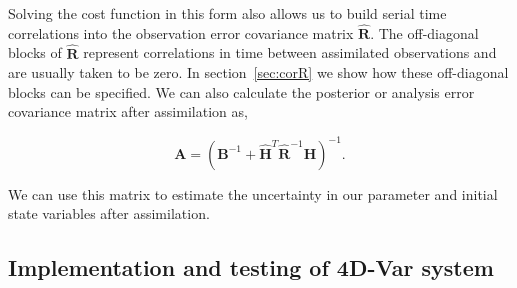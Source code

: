 \documentclass[review]{elsarticle}
\begin{document}
Solving the cost function in this form also allows us to build serial time correlations into the observation error covariance matrix $\hat{\mathbf{R}}$. The off-diagonal blocks of $\hat{\mathbf{R}}$ represent correlations in time between assimilated observations and are usually taken to be zero. In section~\ref{sec:corR} we show how these off-diagonal blocks can be specified. We can also calculate the posterior or analysis error covariance matrix after assimilation as,
\begin{linenomath}
\begin{equation}
\mathbf{A} = (\textbf{B}^{-1} + \hat{\mathbf{H}}^{T}\hat{\textbf{R}}^{-1}\hat{\mathbf{H}})^{-1}. \label{eqn:Amat}
\end{equation}
\end{linenomath}
We can use this matrix to estimate the uncertainty in our parameter and initial state variables after assimilation.

\subsection{Implementation and testing of 4D-Var system} \label{sec:implement4dvar}
\end{document}
